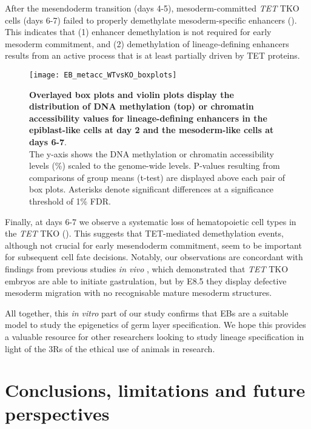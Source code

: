 After the mesendoderm transition (days 4-5), mesoderm-committed \textit{TET} TKO cells (days 6-7) failed to properly demethylate mesoderm-specific enhancers (). This indicates that (1) enhancer demethylation is not required for early mesoderm commitment, and (2) demethylation of lineage-defining enhancers results from an active process that is at least partially driven by TET proteins.

\begin{figure}[H]
	\centering
	\texttt{[image: EB\_metacc\_WTvsKO\_boxplots]}
	\caption[]{
	\textbf{Overlayed box plots and violin plots display the distribution of DNA methylation (top) or chromatin accessibility values for lineage-defining enhancers in the epiblast-like cells at day 2 and the mesoderm-like cells at days 6-7}.\\
	The y-axis shows the DNA methylation  or chromatin accessibility levels (\%) scaled to the genome-wide levels. P-values resulting from comparisons of group means (t-test) are displayed above each pair of box plots. Asterisks denote significant differences at a significance threshold of 1\% FDR.
	}
	\label{fig:EB_metacc_WTvsKO_boxplots}
\end{figure}

Finally, at days 6-7 we observe a systematic loss of hematopoietic cell types in the \textit{TET} TKO (). This suggests that TET-mediated demethylation events, although not crucial for early mesendoderm commitment, seem to be important for subsequent cell fate decisions. Notably, our observations are concordant with findings from previous studies \textit{in vivo} \cite{Dai2016}, which demonstrated that \textit{TET} TKO embryos are able to initiate
gastrulation, but by E8.5 they display defective mesoderm migration with no recognisable mature mesoderm structures.

All together, this \textit{in vitro} part of our study confirms that EBs are a suitable model to study the epigenetics of germ layer specification. We hope this provides a valuable resource for other researchers looking to study lineage specification in light of the 3Rs of the ethical use of animals in research.


\section{Conclusions, limitations and future perspectives}

